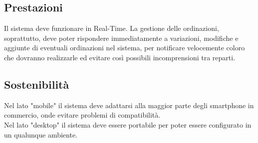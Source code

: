 \subsection{Prestazioni}
Il sistema deve funzionare in Real-Time. La gestione delle ordinazioni, soprattutto, deve poter rispondere immediatamente a variazioni, modifiche e aggiunte di eventuali ordinazioni nel sistema, per notificare velocemente coloro che dovranno realizzarle ed evitare così possibili incomprensioni tra reparti.

\subsection{Sostenibilità}
Nel lato "mobile" il sistema deve adattarsi alla maggior parte degli smartphone in commercio, onde evitare problemi di compatibilità. \\
Nel lato "desktop" il sistema deve essere portabile per poter essere configurato in un qualunque ambiente. 




